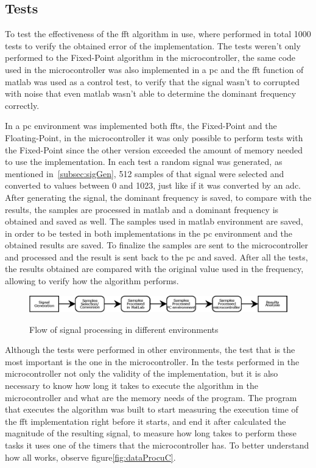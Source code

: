 \subsection{Tests}
To test the effectiveness of the \acrshort{fft} algorithm in use, where performed in total 1000 tests to verify the obtained error of the implementation. The tests weren't only performed to the Fixed-Point algorithm in the microcontroller, the same code used in the microcontroller was also implemented in a \acrshort{pc} and the \acrshort{fft} function of \acrshort{matlab} was used as a control test, to verify that the signal wasn't to corrupted with noise that even \acrshort{matlab} wasn't able to determine the dominant frequency correctly.

In a \acrshort{pc} environment was implemented both \acrshort{fft}s, the Fixed-Point and the Floating-Point, in the microcontroller it was only possible to perform tests with the Fixed-Point since the other version exceeded the amount of memory needed to use the implementation. In each test a random signal was generated, as mentioned in~\ref{subsec:sigGen}, 512 samples of that signal were selected and converted to values between 0 and 1023, just like if it was converted by an \acrshort{adc}. After generating the signal, the dominant frequency is saved, to compare with the results, the samples are processed in \acrshort{matlab} and a dominant frequency is obtained and saved as well. The samples used in \acrshort{matlab} environment are saved, in order to be tested in both implementations in the \acrshort{pc} environment and the obtained results are saved. To finalize the samples are sent to the microcontroller and processed and the result is sent back to the \acrshort{pc} and saved. After all the tests, the results obtained are compared with the original value used in the frequency, allowing to verify how the algorithm performs. 
\begin{figure}[]
    \centering
    \includegraphics[width=1\textwidth]{Chapters/6CHP/Figures/ProcFlow.eps}
    \caption{Flow of signal processing in different environments}{}
    \label{fig:flowProc}
\end{figure}
Although the tests were performed in other environments, the test that is the most important is the one in the microcontroller. In the tests performed in the microcontroller not only the validity of the implementation, but it is also necessary to know how long it takes to execute the algorithm in the microcontroller and what are the memory needs of the program. The program that executes the algorithm was built to start measuring the execution time of the \acrshort{fft} implementation right before it starts, and end it after calculated the magnitude of the resulting signal, to measure how long takes to perform these tasks it uses one of the timers that the microcontroller has. To better understand how all works, observe figure\ref{fig:dataProcuC}.
